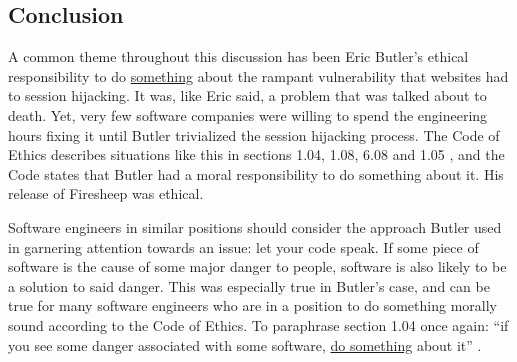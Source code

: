 \documentclass[11pt]{article}
\begin{document}
\begin{multicols}{2}




\section{Conclusion}
A common theme throughout this discussion has been Eric Butler's ethical responsibility to do \uline{something} about the rampant vulnerability that websites had to session hijacking. It was, like Eric said, a problem that was talked about to death. Yet, very few software companies were willing to spend the engineering hours fixing it until Butler trivialized the session hijacking process. The Code of Ethics describes situations like this in sections 1.04, 1.08, 6.08 and 1.05 \cite{se-code}, and the Code  states that Butler had a moral responsibility to do something about it. His release of Firesheep was  ethical.

Software engineers in similar positions should consider the approach Butler used in garnering attention towards an issue: let your code speak. If some piece of software is the cause of some major danger to people, software is also likely to be a solution to said danger. This was especially true in Butler's case, and can be true for many software engineers who are in a position to do something morally sound according to the Code of Ethics. To paraphrase section 1.04 once again: ``if you see some danger associated with some software, \uline{do something} about it'' \cite{se-code}.


\end{multicols}
\newpage

\nocite{*}




\end{document}
